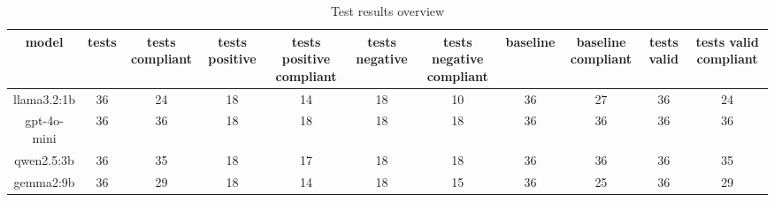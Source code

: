 
  \begin{table}[h!]
  \centering
  \begin{tabular}{|c|c|c|c|c|c|c|c|c|c|c|}
  \hline
  model & tests & tests compliant & tests positive & tests positive compliant & tests negative & tests negative compliant & baseline & baseline compliant & tests valid & tests valid compliant \\
  \hline
  llama3.2:1b & 36 & 24 & 18 & 14 & 18 & 10 & 36 & 27 & 36 & 24\\
\hline
gpt-4o-mini & 36 & 36 & 18 & 18 & 18 & 18 & 36 & 36 & 36 & 36\\
\hline
qwen2.5:3b & 36 & 35 & 18 & 17 & 18 & 18 & 36 & 36 & 36 & 35\\
\hline
gemma2:9b & 36 & 29 & 18 & 14 & 18 & 15 & 36 & 25 & 36 & 29
  \end{tabular}
  \caption{Test results overview}
  
  \end{table}
  